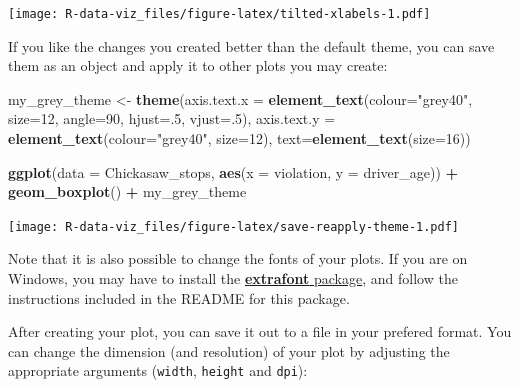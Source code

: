 \documentclass[]{book}
\newenvironment{Shaded}{\begin{snugshade}}{\end{snugshade}}
\newcommand{\KeywordTok}[1]{\textcolor[rgb]{0.13,0.29,0.53}{\textbf{#1}}}
\newcommand{\DataTypeTok}[1]{\textcolor[rgb]{0.13,0.29,0.53}{#1}}
\newcommand{\DecValTok}[1]{\textcolor[rgb]{0.00,0.00,0.81}{#1}}
\newcommand{\StringTok}[1]{\textcolor[rgb]{0.31,0.60,0.02}{#1}}
\newcommand{\OperatorTok}[1]{\textcolor[rgb]{0.81,0.36,0.00}{\textbf{#1}}}
\newcommand{\NormalTok}[1]{#1}
\theoremstyle{definition}
\theoremstyle{definition}
\theoremstyle{definition}
\theoremstyle{remark}
\begin{document}
\texttt{[image: R-data-viz\_files/figure-latex/tilted-xlabels-1.pdf]}

If you like the changes you created better than the default theme, you
can save them as an object and apply it to other plots you may create:

\begin{Shaded}
\begin{Highlighting}[]
\NormalTok{my_grey_theme <-}\StringTok{ }\KeywordTok{theme}\NormalTok{(}\DataTypeTok{axis.text.x =} \KeywordTok{element_text}\NormalTok{(}\DataTypeTok{colour=}\StringTok{"grey40"}\NormalTok{, }\DataTypeTok{size=}\DecValTok{12}\NormalTok{, }\DataTypeTok{angle=}\DecValTok{90}\NormalTok{, }\DataTypeTok{hjust=}\NormalTok{.}\DecValTok{5}\NormalTok{, }\DataTypeTok{vjust=}\NormalTok{.}\DecValTok{5}\NormalTok{),}
                   \DataTypeTok{axis.text.y =} \KeywordTok{element_text}\NormalTok{(}\DataTypeTok{colour=}\StringTok{"grey40"}\NormalTok{, }\DataTypeTok{size=}\DecValTok{12}\NormalTok{), }\DataTypeTok{text=}\KeywordTok{element_text}\NormalTok{(}\DataTypeTok{size=}\DecValTok{16}\NormalTok{))}

\KeywordTok{ggplot}\NormalTok{(}\DataTypeTok{data =}\NormalTok{ Chickasaw_stops, }\KeywordTok{aes}\NormalTok{(}\DataTypeTok{x =}\NormalTok{ violation, }\DataTypeTok{y =}\NormalTok{ driver_age)) }\OperatorTok{+}
\StringTok{  }\KeywordTok{geom_boxplot}\NormalTok{() }\OperatorTok{+}\StringTok{ }
\StringTok{  }\NormalTok{my_grey_theme}
\end{Highlighting}
\end{Shaded}

\texttt{[image: R-data-viz\_files/figure-latex/save-reapply-theme-1.pdf]}

Note that it is also possible to change the fonts of your plots. If you
are on Windows, you may have to install the
\href{https://github.com/wch/extrafont}{\textbf{extrafont} package}, and
follow the instructions included in the README for this package.

After creating your plot, you can save it out to a file in your prefered
format. You can change the dimension (and resolution) of your plot by
adjusting the appropriate arguments (\texttt{width}, \texttt{height} and
\texttt{dpi}):
\end{document}
